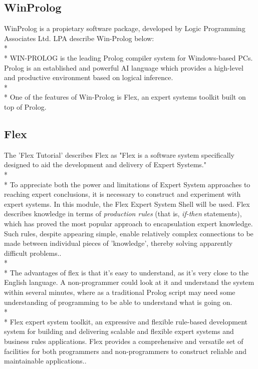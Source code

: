 \documentclass[12pt]{report}
\begin{document}
\subsection{WinProlog}\label{subsec:winprolog}
WinProlog is a propietary software package, developed by Logic Programming Associates Ltd.  LPA describe Win-Prolog below:
\\*
\\*
WIN-PROLOG is the leading Prolog compiler system for Windows-based PCs. Prolog is an established and powerful AI language which provides a high-level and productive environment based on logical inference.\citep{lpawinprolog}
\\*
\\*
One of the features of Win-Prolog is Flex, an expert systems toolkit built on top of Prolog.

\subsection{Flex}\label{subsec:introflex}
The 'Flex Tutorial' describes Flex as "Flex is a software system specifically designed to aid the development and delivery of Expert Systems."
\\*
\\*
To appreciate both the power and limitations of Expert System approaches to reaching expert conclusions, it is necessary to construct and experiment with expert systems.  In this module, the Flex Expert System Shell will be used.  Flex describes knowledge in terms of \textit{production rules} (that is, \textit{if-then} statements), which has proved the most popular approach to encapsulation expert knowledge.  Such rules, despite appearing simple, enable relatively complex connections to be made between individual pieces of 'knowledge', thereby solving apparently difficult problems.\citep{flexsystems09}.
\\*
\\*
The advantages of flex is that it's easy to understand, as it's very close to the English language.  A non-programmer could look at it and understand the system within several minutes, where as a traditional Prolog script may need some understanding of programming to be able to understand what is going on.
\\*
\\*
Flex expert system toolkit, an expressive and flexible rule-based development system for building and delivering scalable and flexible expert systems and business rules applications. Flex provides a comprehensive and versatile set of facilities for both programmers and non-programmers to construct reliable and maintainable applications.\citep{lpawinprolog-flex}.
\end{document}

